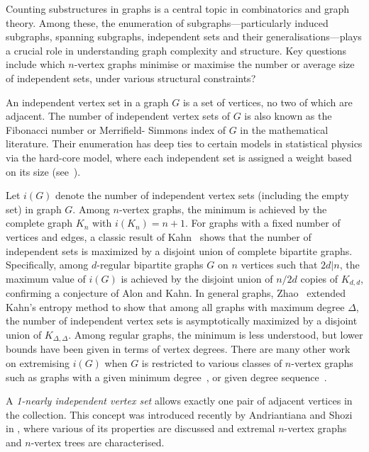\documentclass[a4paper,12pt]{amsart}
\theoremstyle{remark}
\begin{document}
Counting substructures in graphs is a central topic in combinatorics and graph theory. Among these, the enumeration of subgraphs---particularly induced subgraphs, spanning subgraphs, independent sets and their generalisations---plays a crucial role in understanding graph complexity and structure. Key questions include which $n$-vertex graphs minimise or maximise the number or average size of independent sets, under various structural constraints? 

An independent vertex set in a graph $G$ is a set of vertices, no two of which are adjacent. The number of independent vertex sets of $G$ is also known as the Fibonacci number or Merrifield-
Simmons index of $G$ in the mathematical literature. Their enumeration has deep ties to certain models in statistical physics via the hard-core model, where each independent set is assigned a weight based on its size (see~\cite{Martin2009}). 

Let $i(G)$ denote the number of independent vertex sets (including the empty set) in graph $G$. Among $n$-vertex graphs, the minimum is achieved by the complete graph $K_n$ with $i(K_n) = n+1$. For graphs with a fixed number of vertices and edges, a classic result of Kahn~\cite{kahn2001} shows that the number of independent sets is maximized by a disjoint union of complete bipartite graphs. Specifically, among $d$-regular bipartite graphs $G$ on $n$ vertices such that $2d | n$, the maximum value of $i(G)$ is achieved by the disjoint union of $n/2d$ copies of $K_{d,d}$, confirming a conjecture of Alon and Kahn. In general graphs, Zhao~\cite{zhao2010} extended Kahn's entropy method to show that among all graphs with maximum degree $\Delta$, the number of independent vertex sets is asymptotically maximized by a disjoint union of $K_{\Delta, \Delta}$. Among regular graphs, the minimum is less understood, but lower bounds have been given in terms of vertex degrees. There are many other work on extremising $i(G)$ when $G$ is restricted to various classes of $n$-vertex graphs such as graphs with a given minimum degree~\cite{Galvin,Gan}, or given degree sequence~\cite{ANDRIANTIANA2013724}.

A \emph{1-nearly independent vertex set} allows exactly one pair of adjacent vertices in the collection. This concept was introduced recently by Andriantiana and Shozi in \cite{shozi2024vertex}, where various of its properties are discussed and extremal $n$-vertex graphs and $n$-vertex trees are characterised.  %
\end{document}
